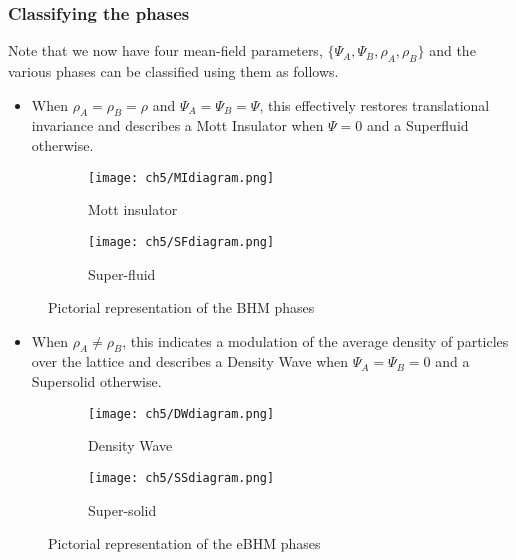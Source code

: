 \subsubsection{\large Classifying the phases}
Note that we now have four mean-field parameters, $\{\Psi_A, \Psi_B, \rho_A, \rho_B\}$ and the various phases can be classified using them as follows.
\begin{itemize}
    \item When $\rho_A = \rho_B = \rho$ and $\Psi_A = \Psi_B = \Psi$, this effectively restores translational invariance and describes a Mott Insulator when $\Psi = 0$ and a Superfluid otherwise.
\end{itemize}
\begin{figure}[!htb]
    \centering
    \begin{subfigure}[b]{0.45\textwidth}  %
        \centering
        \texttt{[image: ch5/MIdiagram.png]}
        \caption{Mott insulator}
    \end{subfigure}
    \hspace{1em}  %
    \begin{subfigure}[b]{0.45\textwidth}
        \centering
        \texttt{[image: ch5/SFdiagram.png]}
        \caption{Super-fluid}
    \end{subfigure}
    \caption{Pictorial representation of the BHM phases}
    \label{}
\end{figure}
\FloatBarrier \!\!\!\!\!\!\!\!\!\!\!
\vspace{-0.3cm}
\begin{itemize}
    \item When $\rho_A \neq \rho_B$, this indicates a modulation of the average density of particles over the lattice and describes a Density Wave when $\Psi_A = \Psi_B = 0$ and a Supersolid otherwise.
\end{itemize}

\begin{figure}[!htb]
    \centering
    \begin{subfigure}[b]{0.45\textwidth}  %
        \centering
        \texttt{[image: ch5/DWdiagram.png]}
        \caption{Density Wave}
    \end{subfigure}
    \hspace{1em}  %
    \begin{subfigure}[b]{0.45\textwidth}
        \centering
        \texttt{[image: ch5/SSdiagram.png]}
        \caption{Super-solid}
    \end{subfigure}
    \caption{Pictorial representation of the eBHM phases}
    \label{}
\end{figure}
\FloatBarrier \!\!\!\!\!\!\!\!\!\!\!

